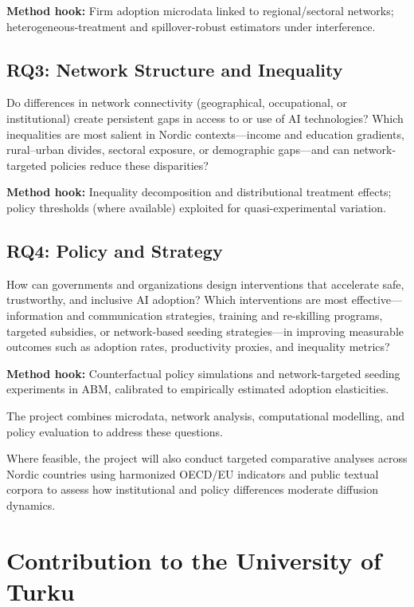 \documentclass{nfr}
\begin{document}
\noindent \textbf{Method hook:} Firm adoption microdata linked to regional/sectoral networks; heterogeneous-treatment and spillover-robust estimators under interference.

\subsection*{RQ3: Network Structure and Inequality}

Do differences in network connectivity (geographical, occupational, or institutional) create persistent gaps in access to or use of AI technologies? Which inequalities are most salient in Nordic contexts—income and education gradients, rural--urban divides, sectoral exposure, or demographic gaps—and can network-targeted policies reduce these disparities?

\noindent \textbf{Method hook:} Inequality decomposition and distributional treatment effects; policy thresholds (where available) exploited for quasi-experimental variation.

\subsection*{RQ4: Policy and Strategy}

How can governments and organizations design interventions that accelerate safe, trustworthy, and inclusive AI adoption? Which interventions are most effective—information and communication strategies, training and re-skilling programs, targeted subsidies, or network-based seeding strategies—in improving measurable outcomes such as adoption rates, productivity proxies, and inequality metrics?

\noindent \textbf{Method hook:} Counterfactual policy simulations and network-targeted seeding experiments in ABM, calibrated to empirically estimated adoption elasticities.

The project combines microdata, network analysis, computational modelling, and policy evaluation to address these questions.

Where feasible, the project will also conduct targeted comparative analyses across Nordic countries using harmonized OECD/EU indicators and public textual corpora to assess how institutional and policy differences moderate diffusion dynamics.

\section{Contribution to the University of Turku}
\end{document}
